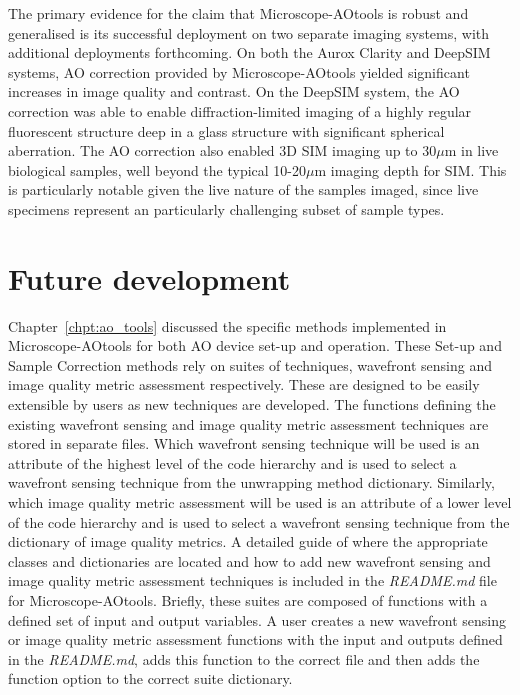 The primary evidence for the claim that Microscope-AOtools is robust and 
generalised is its successful deployment on two separate imaging systems, 
with additional deployments forthcoming. On both the Aurox Clarity and 
DeepSIM systems, AO correction provided by Microscope-AOtools yielded 
significant increases in image quality and contrast. On the DeepSIM system, 
the AO correction was able to enable diffraction-limited imaging of a highly 
regular fluorescent structure deep in a glass structure with
significant spherical aberration. The AO correction 
also enabled 3D SIM imaging up to 30$\mu$m in live biological samples, well beyond the typical 10-20$\mu$m imaging depth for 
SIM\cite{schermelleh2019super,wu2018faster}. This is particularly notable 
given the live nature of the samples imaged, since live specimens represent an 
particularly challenging subset of sample types.

\section{Future development}
\label{sec:future_dev}

Chapter~\ref{chpt:ao_tools} discussed the specific methods implemented in 
Microscope-AOtools for both AO device set-up and operation. These Set-up 
and  Sample Correction methods rely on suites of techniques, wavefront 
sensing and image quality metric assessment respectively. These are 
designed to be easily extensible by users as new techniques are developed. 
The functions defining the existing wavefront sensing and image quality 
metric assessment techniques are stored in separate files. Which wavefront 
sensing technique will be used is an attribute of the highest level
of the code hierarchy and is used to select a wavefront sensing technique 
from the unwrapping method dictionary. Similarly, which image quality 
metric assessment will be used is an attribute of a lower level	of the 
code hierarchy and is used to select a wavefront sensing technique from 
the dictionary of image quality metrics. A detailed guide of where the 
appropriate classes and dictionaries are located and how to add new 
wavefront sensing and image quality metric assessment techniques is 
included in the \textit{README.md} file for Microscope-AOtools. Briefly, 
these suites are composed of functions with a defined set of input and 
output variables. A user creates a new wavefront sensing or image 
quality metric assessment functions with the input and outputs defined 
in the \textit{README.md}, adds this function to the correct file and 
then adds the function option to the correct suite dictionary.

